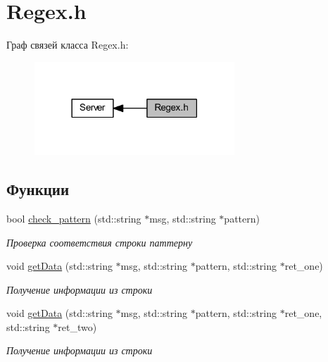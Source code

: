 \hypertarget{group__regexh}{}\section{Regex.\+h}
\label{group__regexh}
Граф связей класса Regex.\+h\+:\nopagebreak
\begin{figure}[H]
\begin{center}
\leavevmode
\includegraphics[width=213pt]{group__regexh}
\end{center}
\end{figure}
\subsection*{Функции}
\begin{DoxyCompactItemize}
\item 
bool \mbox{\hyperlink{group__regexh_gac4882c93b963bd53fd60978a9661fa30}{check\+\_\+pattern}} (std\+::string $\ast$msg, std\+::string $\ast$pattern)
\begin{DoxyCompactList}\small\item\em Проверка соответствия строки паттерну \end{DoxyCompactList}\item 
void \mbox{\hyperlink{group__regexh_ga524588640ff7393a801141740202d9dc}{get\+Data}} (std\+::string $\ast$msg, std\+::string $\ast$pattern, std\+::string $\ast$ret\+\_\+one)
\begin{DoxyCompactList}\small\item\em Получение информации из строки \end{DoxyCompactList}\item 
void \mbox{\hyperlink{group__regexh_ga0ac985b5fff36005eb80cda832582ca9}{get\+Data}} (std\+::string $\ast$msg, std\+::string $\ast$pattern, std\+::string $\ast$ret\+\_\+one, std\+::string $\ast$ret\+\_\+two)
\begin{DoxyCompactList}\small\item\em Получение информации из строки \end{DoxyCompactList}\end{DoxyCompactItemize}


